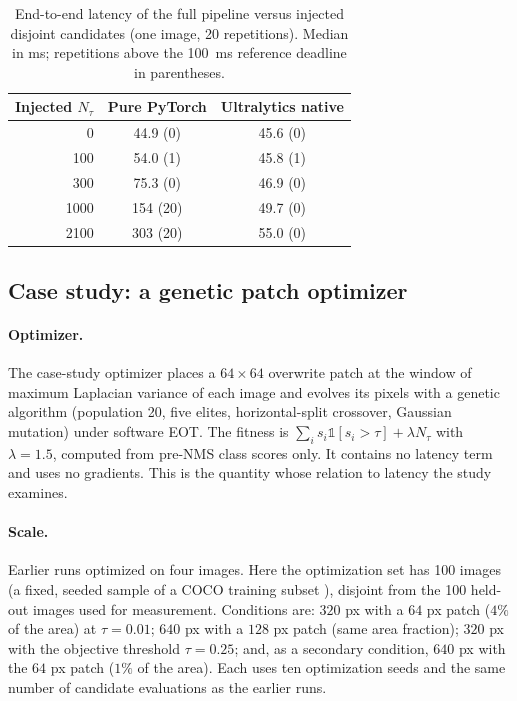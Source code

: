 \documentclass[a4paper,fleqn]{cas-dc}
\newcommand{\Ntau}{N_{\tau}}
\begin{document}
\begin{table}[t]
\centering\small
\caption{End-to-end latency of the full pipeline versus injected disjoint candidates (one image, 20 repetitions). Median in ms; repetitions above the 100~ms reference deadline in parentheses.}
\label{tab:pipe}
\begin{tabular}{@{}rcc@{}}
\toprule
Injected $\Ntau$ & Pure PyTorch & Ultralytics native \\
\midrule
0 & 44.9 (0) & 45.6 (0) \\
100 & 54.0 (1) & 45.8 (1) \\
300 & 75.3 (0) & 46.9 (0) \\
1000 & 154 (20) & 49.7 (0) \\
2100 & 303 (20) & 55.0 (0) \\
\bottomrule
\end{tabular}
\end{table}

\subsection{Case study: a genetic patch optimizer}
\paragraph{Optimizer.}
The case-study optimizer places a $64\times64$ overwrite patch at the window of maximum Laplacian variance of each image and evolves its pixels with a genetic algorithm (population 20, five elites, horizontal-split crossover, Gaussian mutation) under software EOT. The fitness is $\sum_i s_i \mathbb{1}[s_i>\tau]+\lambda \Ntau$ with $\lambda=1.5$, computed from pre-NMS class scores only. It contains no latency term and uses no gradients. This is the quantity whose relation to latency the study examines.
\paragraph{Scale.}
Earlier runs optimized on four images. Here the optimization set has 100 images (a fixed, seeded sample of a COCO training subset \cite{lin2014coco}), disjoint from the 100 held-out images used for measurement. Conditions are: $320$ px with a $64$ px patch ($4\%$ of the area) at $\tau=0.01$; $640$ px with a $128$ px patch (same area fraction); $320$ px with the objective threshold $\tau=0.25$; and, as a secondary condition, $640$ px with the $64$ px patch ($1\%$ of the area). Each uses ten optimization seeds and the same number of candidate evaluations as the earlier runs.
\end{document}
